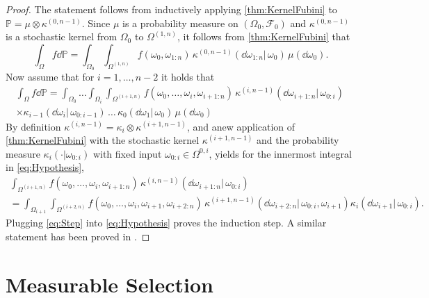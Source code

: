 \documentclass[
    a4paper,
    11pt,
    bibliography=totoc,
    listof=totoc,      
    headinclude=true,
    cleardoublepage=empty,
]{scrbook}
\theoremstyle{plain}
\theoremstyle{definition}
\theoremstyle{remark}
\newcommand{\PM}{\mathbb P}
\begin{document}
\begin{proof}
    The statement follows from inductively applying \cref{thm:KernelFubini}
    to $\PM = \mu\otimes\kappa^{(0,n-1)}$. Since $\mu$ is a probability 
    measure on $(\Omega_0,\mathcal{F}_0)$ and $\kappa^{(0,n-1)}$ is a 
    stochastic kernel from $\Omega_0$ to $\Omega^{(1,n)}$, it follows from 
    \cref{thm:KernelFubini} that
    \[
        \int_{\Omega} f \dd{\PM}
        = \int_{\Omega_0} \int_{\Omega^{(1,n)}}
            f(\omega_0, \omega_{1:n}) \,
        \kappa^{(0,n-1)} (\dd{\omega_{1:n}} | \, \omega_0 ) \,
        \mu(\dd{\omega_0}).
    \]
    Now assume that for $i = 1,\dots,n-2 $ it holds that
    \begin{multline}
    \label{eq:Hypothesis}
        \int_{\Omega} f \dd{\PM}
        = \int_{\Omega_0} \dots \int_{\Omega_i} \int_{\Omega^{(i+1,n)}}
            f(\omega_0, \dots, \omega_i, \omega_{i+1:n}) \,
        \kappa^{(i,n-1)} (\dd{\omega_{i+1:n}} | \, \omega_{0:i} ) \, \\
        \times
        \kappa_{i-1}(\dd{\omega_i} |\, \omega_{0:i-1}) \, 
        \dots \,
        \kappa_0(\dd{\omega_1} |\, \omega_0) \,
        \mu(\dd{\omega_0})
    \end{multline}
    By definition $\kappa^{(i,n-1)}=\kappa_i\otimes\kappa^{(i+1,n-1)}$, and 
    anew application of \cref{thm:KernelFubini} with the stochastic kernel 
    $\kappa^{(i+1,n-1)}$ and the probability measure $\kappa_i(\cdot | 
    \omega_{0:i})$ with fixed input $\omega_{0:i}\in\Omega^{0,i}$, yields for 
    the innermost integral in
    \eqref{eq:Hypothesis},
    \begin{multline}
    \label{eq:Step}
        \int_{\Omega^{(i+1,n)}}
            f(\omega_0, \dots, \omega_i, \omega_{i+1:n}) \,
        \kappa^{(i,n-1)} (\dd{\omega_{i+1:n}} | \, \omega_{0:i} ) \\
        = \int_{\Omega_{i+1}} \int_{\Omega^{(i+2,n)}}
            f(\omega_0, \dots, \omega_i, \omega_{i+1}, \omega_{i+2:n}) \,
        \kappa^{(i+1,n-1)} (\dd{\omega_{i+2:n}} | \, \omega_{0:i}, 
            \omega_{i+1} )
        \kappa_{i}(\dd{\omega_{i+1}} |\, \omega_{0:i}).
    \end{multline}
    Plugging \eqref{eq:Step} into \eqref{eq:Hypothesis} proves the induction 
    step. A similar statement has been proved in \cite[Proposition~7.28]{bertsekas1996_socdc}.
\end{proof}

\section{Measurable Selection}
\label{appendix:MeasurableSelection}
\end{document}
